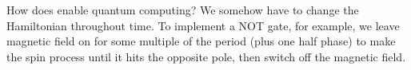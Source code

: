 How does enable quantum computing? We somehow have to change the Hamiltonian throughout time. To implement a NOT gate, for example, we leave magnetic field on for some
multiple of the period (plus one half phase) to make the spin process until it hits the opposite pole, then switch off the magnetic field.
